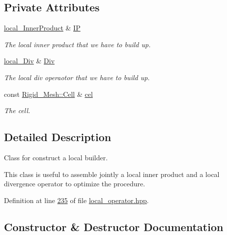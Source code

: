 \subsection*{Private Attributes}
\begin{DoxyCompactItemize}
\item 
\hyperlink{classFVCode3D_1_1local__InnerProduct}{local\+\_\+\+Inner\+Product} \& \hyperlink{classFVCode3D_1_1local__builder_adc109a32e01c2f6acb673ee503c37446}{IP}
\begin{DoxyCompactList}\small\item\em The local inner product that we have to build up. \end{DoxyCompactList}\item 
\hyperlink{classFVCode3D_1_1local__Div}{local\+\_\+\+Div} \& \hyperlink{classFVCode3D_1_1local__builder_a2ac4ebad7f42bb69cdd73fdf215b7e99}{Div}
\begin{DoxyCompactList}\small\item\em The local div operaotor that we have to build up. \end{DoxyCompactList}\item 
const \hyperlink{classFVCode3D_1_1Rigid__Mesh_1_1Cell}{Rigid\+\_\+\+Mesh\+::\+Cell} \& \hyperlink{classFVCode3D_1_1local__builder_a4fe73771f0cce11419c866ab34ee8fd4}{cel}
\begin{DoxyCompactList}\small\item\em The cell. \end{DoxyCompactList}\end{DoxyCompactItemize}


\subsection{Detailed Description}
Class for construct a local builder. 

This class is useful to assemble jointly a local inner product and a local divergence operator to optimize the procedure. 

Definition at line \hyperlink{local__operator_8hpp_source_l00235}{235} of file \hyperlink{local__operator_8hpp_source}{local\+\_\+operator.\+hpp}.



\subsection{Constructor \& Destructor Documentation}

